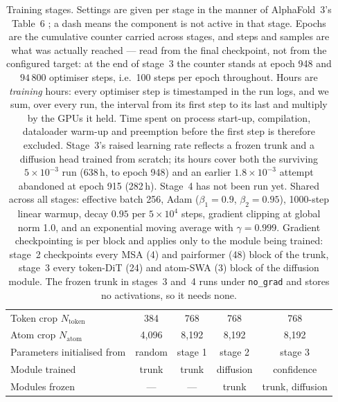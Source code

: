 \documentclass[11pt]{article}
\begin{document}
\begin{table}[t]
\centering\footnotesize\sffamily
\caption{\normalfont\rmfamily\small Training stages. Settings are given per
stage in the manner of AlphaFold~3's Table~6 \citep{af3}; a dash means the
component is not active in that stage. Epochs are the cumulative counter
carried across stages, and steps and samples are what was actually reached ---
read from the final checkpoint, not from the configured target: at the end of
stage~3 the counter stands at epoch 948 and $94\,800$ optimiser steps, i.e.\ 100
steps per epoch throughout. Hours are \emph{training} hours: every optimiser
step is timestamped in the run logs, and we sum, over every run, the interval
from its first step to its last and multiply by the GPUs it held. Time spent on
process start-up, compilation, dataloader warm-up and preemption before the
first step is therefore excluded. Stage~3's raised learning rate reflects a
frozen trunk and a diffusion head trained from scratch; its hours cover both the
surviving $5\times10^{-3}$ run (638\,h, to epoch 948) and an earlier
$1.8\times10^{-3}$ attempt abandoned at epoch 915 (282\,h). Stage~4 has
not been run yet. Shared across all stages:
effective batch 256, Adam ($\beta_1=0.9$, $\beta_2=0.95$), 1000-step linear
warmup, decay $0.95$ per $5\times10^4$ steps, gradient clipping at global norm
1.0, and an exponential moving average with $\gamma=0.999$. Gradient checkpointing is per block and
applies only to the module being trained: stage~2 checkpoints every MSA (4) and
pairformer (48) block of the trunk, stage~3 every token-DiT (24) and atom-SWA
(3) block of the diffusion module. The frozen trunk in stages~3 and~4 runs
under \texttt{no\_grad} and stores no activations, so it needs none.}
\label{tab:stages}
\begin{tabularx}{\linewidth}{@{}Xcccc@{}}
\toprule
\rmfamily & \rmfamily 1 & \rmfamily 2 & \rmfamily 3 & \rmfamily 4 \\
\midrule
\rmfamily Token crop $N_{\mathrm{token}}$      & 384 & 768 & 768 & 768 \\
\rmfamily Atom crop $N_{\mathrm{atom}}$        & 4{,}096 & 8{,}192 & 8{,}192 & 8{,}192 \\
\rmfamily Parameters initialised from          & random & stage 1 & stage 2 & stage 3 \\
\rmfamily Module trained                       & trunk & trunk & diffusion & confidence \\
\rmfamily Modules frozen                       & --- & --- & trunk & trunk, diffusion \\

\end{tabularx}
\end{table}
\end{document}
